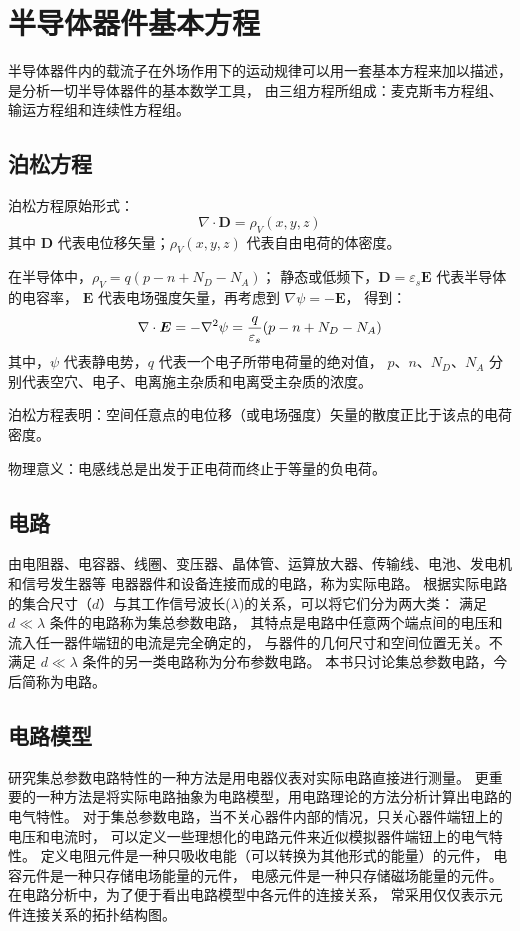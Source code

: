 \section{半导体器件基本方程}

半导体器件内的载流子在外场作用下的运动规律可以用一套基本方程来加以描述，
是分析一切半导体器件的基本数学工具，
由三组方程所组成：麦克斯韦方程组、输运方程组和连续性方程组。

\subsection{泊松方程}
泊松方程原始形式：
\begin{equation}
    \nabla \cdot \boldsymbol{D} = \rho_V(x,y,z)
\end{equation}
其中 $\boldsymbol{D}$ 代表电位移矢量；$\rho_V(x,y,z)$ 代表自由电荷的体密度。

在半导体中，$\rho_V=q(p-n+N_D-N_A)$；
静态或低频下，$\boldsymbol{D}=\varepsilon_s\boldsymbol{E}$ 代表半导体的电容率，
$\boldsymbol{E}$ 代表电场强度矢量，再考虑到 $\nabla \psi = -\boldsymbol{E}$，
得到：
\begin{equation}
    \nabla \cdot \boldsymbol{E} = -\nabla^2\psi
    = {q \over \varepsilon_s}(p-n+N_D-N_A)
\end{equation}
其中，$\psi$ 代表静电势，$q$ 代表一个电子所带电荷量的绝对值，
$p$、$n$、$N_D$、$N_A$ 分别代表空穴、电子、电离施主杂质和电离受主杂质的浓度。

泊松方程表明：空间任意点的电位移（或电场强度）矢量的散度正比于该点的电荷密度。

物理意义：电感线总是出发于正电荷而终止于等量的负电荷。

\subsection{电路}
由电阻器、电容器、线圈、变压器、晶体管、运算放大器、传输线、电池、发电机和信号发生器等
电器器件和设备连接而成的电路，称为实际电路。
根据实际电路的集合尺寸（$d$）与其工作信号波长($\lambda$)的关系，可以将它们分为两大类：
满足 $d\ll\lambda$ 条件的电路称为集总参数电路，
其特点是电路中任意两个端点间的电压和流入任一器件端钮的电流是完全确定的，
与器件的几何尺寸和空间位置无关。不满足 $d\ll\lambda$ 条件的另一类电路称为分布参数电路。
本书只讨论集总参数电路，今后简称为电路。

\subsection{电路模型}
研究集总参数电路特性的一种方法是用电器仪表对实际电路直接进行测量。
更重要的一种方法是将实际电路抽象为电路模型，用电路理论的方法分析计算出电路的电气特性。
对于集总参数电路，当不关心器件内部的情况，只关心器件端钮上的电压和电流时，
可以定义一些理想化的电路元件来近似模拟器件端钮上的电气特性。
定义电阻元件是一种只吸收电能（可以转换为其他形式的能量）的元件，
电容元件是一种只存储电场能量的元件，
电感元件是一种只存储磁场能量的元件。
在电路分析中，为了便于看出电路模型中各元件的连接关系，
常采用仅仅表示元件连接关系的拓扑结构图。

